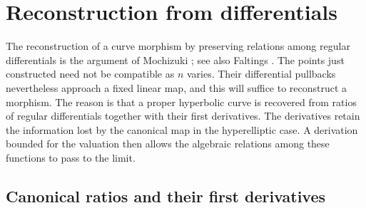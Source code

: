 \documentclass[11pt,a4paper]{article}
\numberwithin{equation}{section}
\theoremstyle{plain}
\theoremstyle{definition}
\theoremstyle{remark}
\renewcommand{\S}{\ensuremath{\mathsection}}
\begin{document}
\section{Reconstruction from differentials}
\label{sec:reconstruction}

The reconstruction of a curve morphism by preserving relations among
regular differentials is the argument of Mochizuki
\cite[Proposition~12.1 and Corollary~13.4]{Mochizuki1999}; see also
Faltings \cite[\S6]{Faltings1998}.
The points just constructed need not be compatible as $n$ varies.
Their differential pullbacks nevertheless approach a fixed linear map,
and this will suffice to reconstruct a morphism. The reason is that a
proper hyperbolic curve is recovered from ratios of regular
differentials together with their first derivatives. The derivatives
retain the information lost by the canonical map in the hyperelliptic
case. A derivation bounded for the valuation then allows the algebraic
relations among these functions to pass to the limit.

\subsection{Canonical ratios and their first derivatives}
\end{document}
